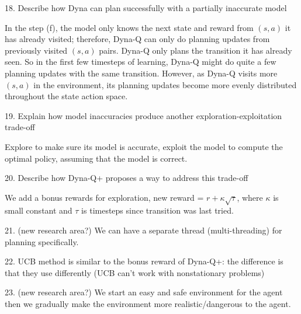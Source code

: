 \documentclass[sutton_barto_notes.tex]{subfiles}
\begin{document}
18. Describe how Dyna can plan successfully with a partially inaccurate model 

In the step (f), the model only knows the next state and reward from $(s,a)$ it has already visited; therefore, Dyna-Q can only do planning updates from previously visited $(s,a)$ pairs. Dyna-Q only plans the transition it has already seen. So in the first few timesteps of learning, Dyna-Q might do quite a few planning updates with the same transition. However, as Dyna-Q visits more $(s,a)$ in the environment, its planning updates become more evenly distributed throughout the state action space.

19. Explain how model inaccuracies produce another exploration-exploitation trade-off 

Explore to make sure its model is accurate, exploit the model to compute the optimal policy, assuming that the model is correct.

20. Describe how Dyna-Q+ proposes a way to address this trade-off

We add a bonus rewards for exploration, new reward = $r + \kappa\sqrt{\tau}$, where $\kappa$ is small constant and $\tau$ is timesteps since transition was last tried.

21. (new research area?) We can have a separate thread (multi-threading) for planning specifically.

22. UCB method is similar to the bonus reward of Dyna-Q+: the difference is that they use differently (UCB can't work with nonstationary problems)

23. (new research area?) We start an easy and safe environment for the agent then we gradually make the environment more realistic/dangerous to the agent.
\end{document}
